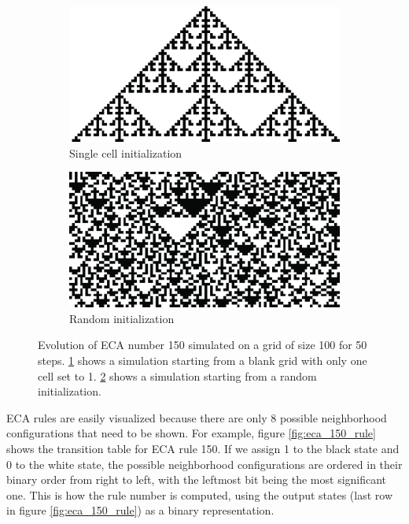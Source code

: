 \begin{figure}[htbp]
  \centering
\begin{subfigure}[b]{.45\linewidth}
  \centering
  \includegraphics[width=\linewidth]{figures/eca_150_single.pdf}
  \caption{Single cell initialization}
  \label{fig:eca_150_single}
\end{subfigure}
\begin{subfigure}[b]{.45\linewidth}
  \centering
  \includegraphics[width=\linewidth]{figures/eca_150_random.pdf}
  \caption{Random initialization}
  \label{fig:eca_150_random}
\end{subfigure}
\caption{Evolution of \ac{ECA} number 150 simulated on a grid of size 100 for 50
  steps. \ref{fig:eca_150_single} shows a simulation starting from a blank grid
  with only one cell set to 1. \ref{fig:eca_150_random} shows a simulation
  starting from a random initialization.}
  \label{fig:eca_150}
\end{figure}


\ac{ECA} rules are easily visualized because there are only 8 possible
neighborhood configurations that need to be shown. For example, figure
\ref{fig:eca_150_rule} shows the transition table for \ac{ECA} rule 150. If we
assign 1 to the black state and 0 to the white state, the possible neighborhood
configurations are ordered in their binary order from right to left, with the
leftmost bit being the most significant one. This is how the rule number is
computed, using the output states (last row in figure \ref{fig:eca_150_rule}) as
a binary representation.

